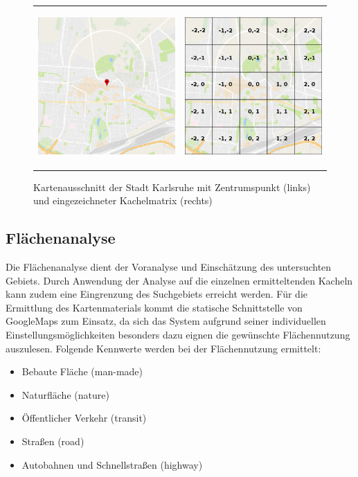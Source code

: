 \begin{figure}
\centering
\begin{tabular}{@{}cc@{}}
    \includegraphics[height=6cm]{images/Karlsruhe_with_center.png} &
    \includegraphics[height=6cm]{images/Karlsruhe_grid.png} \\
\end{tabular}
\caption{Kartenausschnitt der Stadt Karlsruhe mit Zentrumspunkt (links) und eingezeichneter Kachelmatrix (rechts)}
\label{fig:tilemap}
\end{figure}

\subsection{Flächenanalyse}
\label{sec:area-analysis}

Die Flächenanalyse dient der Voranalyse und Einschätzung des untersuchten Gebiets. Durch Anwendung der Analyse auf die einzelnen ermitteltenden Kacheln kann zudem eine Eingrenzung des Suchgebiets erreicht werden. Für die Ermittlung des Kartenmaterials kommt  die statische Schnittstelle von GoogleMaps zum Einsatz, da sich das System aufgrund seiner individuellen Einstellungsmöglichkeiten besonders dazu eignen die gewünschte Flächennutzung auszulesen. Folgende Kennwerte werden bei der Flächennutzung ermittelt:

\begin{itemize}
\item Bebaute Fläche (man-made)
\item Naturfläche (nature)
\item Öffentlicher Verkehr (transit)
\item Straßen (road)
\item Autobahnen und Schnellstraßen (highway)
\end{itemize}

